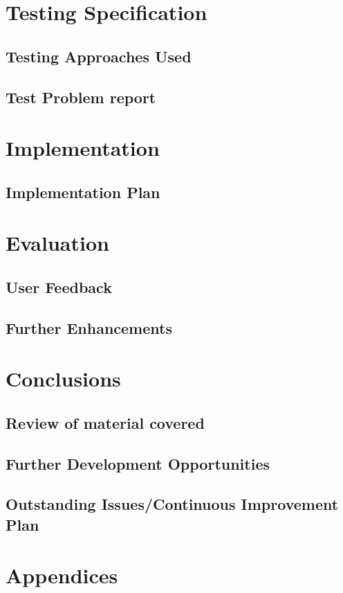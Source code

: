\documentclass[a4paper,12pt]{article}
\begin{document}
\section {Testing Specification}
\subsection {Testing Approaches Used}
\subsection {Test Problem report}

\section {Implementation}
\subsection {Implementation Plan}

\section {Evaluation}
\subsection {User Feedback}
\subsection {Further Enhancements}

\section {Conclusions}
\subsection {Review of material covered }
\subsection {Further Development Opportunities}
\subsection {Outstanding Issues/Continuous Improvement Plan}

\section {Appendices}
\end{document}
